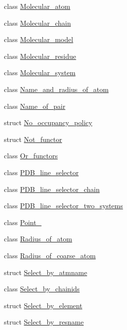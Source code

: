 \begin{DoxyCompactItemize}
\item 
class \hyperlink{classESBTL_1_1Molecular__atom}{Molecular\+\_\+atom}
\item 
class \hyperlink{classESBTL_1_1Molecular__chain}{Molecular\+\_\+chain}
\item 
class \hyperlink{classESBTL_1_1Molecular__model}{Molecular\+\_\+model}
\item 
class \hyperlink{classESBTL_1_1Molecular__residue}{Molecular\+\_\+residue}
\item 
class \hyperlink{classESBTL_1_1Molecular__system}{Molecular\+\_\+system}
\item 
class \hyperlink{classESBTL_1_1Name__and__radius__of__atom}{Name\+\_\+and\+\_\+radius\+\_\+of\+\_\+atom}
\item 
class \hyperlink{classESBTL_1_1Name__of__pair}{Name\+\_\+of\+\_\+pair}
\item 
struct \hyperlink{structESBTL_1_1No__occupancy__policy}{No\+\_\+occupancy\+\_\+policy}
\item 
struct \hyperlink{structESBTL_1_1Not__functor}{Not\+\_\+functor}
\item 
class \hyperlink{classESBTL_1_1Or__functors}{Or\+\_\+functors}
\item 
class \hyperlink{classESBTL_1_1PDB__line__selector}{P\+D\+B\+\_\+line\+\_\+selector}
\item 
class \hyperlink{classESBTL_1_1PDB__line__selector__chain}{P\+D\+B\+\_\+line\+\_\+selector\+\_\+chain}
\item 
class \hyperlink{classESBTL_1_1PDB__line__selector__two__systems}{P\+D\+B\+\_\+line\+\_\+selector\+\_\+two\+\_\+systems}
\item 
class \hyperlink{classESBTL_1_1Point__3}{Point\+\_}
\item 
class \hyperlink{classESBTL_1_1Radius__of__atom}{Radius\+\_\+of\+\_\+atom}
\item 
class \hyperlink{classESBTL_1_1Radius__of__coarse__atom}{Radius\+\_\+of\+\_\+coarse\+\_\+atom}
\item 
struct \hyperlink{structESBTL_1_1Select__by__atmname}{Select\+\_\+by\+\_\+atmname}
\item 
class \hyperlink{classESBTL_1_1Select__by__chainids}{Select\+\_\+by\+\_\+chainids}
\item 
struct \hyperlink{structESBTL_1_1Select__by__element}{Select\+\_\+by\+\_\+element}
\item 
struct \hyperlink{structESBTL_1_1Select__by__resname}{Select\+\_\+by\+\_\+resname}
\item 

\end{DoxyCompactItemize}
